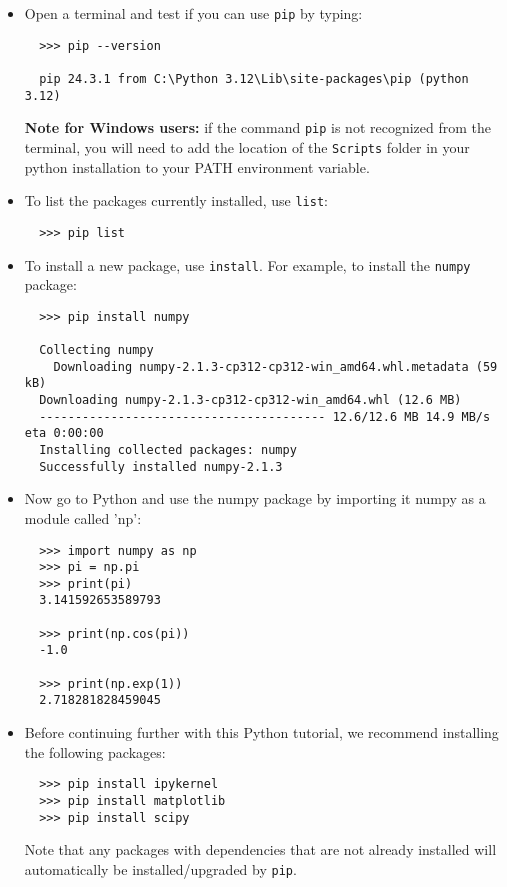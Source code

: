 \documentclass{UNB-Physics-Assignment}
\begin{document}
\begin{itemize}

\item Open a terminal and test if you can use \verb"pip" by typing:
\begin{verbatim}
  >>> pip --version

  pip 24.3.1 from C:\Python 3.12\Lib\site-packages\pip (python 3.12)
\end{verbatim}

\textbf{Note for Windows users:} if the command \verb"pip" is not recognized from the terminal, you will need to add the location of the \verb"Scripts" folder in your python installation to your PATH environment variable.

\item To list the packages currently installed, use \verb"list":
\begin{verbatim}
  >>> pip list
\end{verbatim}

\item To install a new package, use \verb"install". For example, to install the \verb"numpy" package:
\begin{verbatim}
  >>> pip install numpy

  Collecting numpy
    Downloading numpy-2.1.3-cp312-cp312-win_amd64.whl.metadata (59 kB)
  Downloading numpy-2.1.3-cp312-cp312-win_amd64.whl (12.6 MB)
  ---------------------------------------- 12.6/12.6 MB 14.9 MB/s eta 0:00:00
  Installing collected packages: numpy
  Successfully installed numpy-2.1.3
\end{verbatim}

\item Now go to Python and use the numpy package by importing it numpy as a module called 'np':
\begin{verbatim}
  >>> import numpy as np
  >>> pi = np.pi
  >>> print(pi)
  3.141592653589793

  >>> print(np.cos(pi))
  -1.0

  >>> print(np.exp(1))
  2.718281828459045
\end{verbatim}

\item Before continuing further with this Python tutorial, we recommend installing the following packages:
\begin{verbatim}
  >>> pip install ipykernel
  >>> pip install matplotlib
  >>> pip install scipy
\end{verbatim}
Note that any packages with dependencies that are not already installed will automatically be installed/upgraded by \verb"pip".

\end{itemize}
\end{document}

